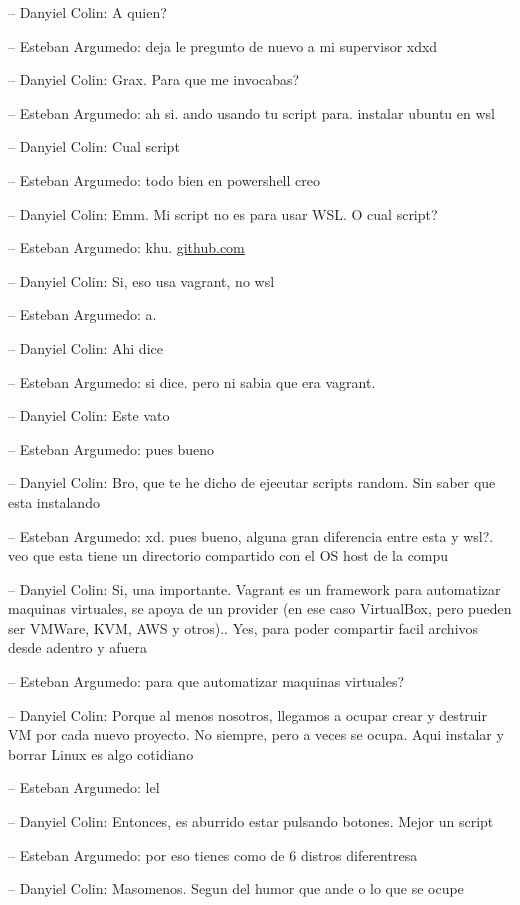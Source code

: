 -- Danyiel Colin: A quien?

-- Esteban Argumedo: deja le pregunto de nuevo a mi supervisor xdxd

-- Danyiel Colin: Grax. Para que me invocabas?

-- Esteban Argumedo: ah si. ando usando tu script para. instalar ubuntu
en wsl

-- Danyiel Colin: Cual script

-- Esteban Argumedo: todo bien en powershell creo

-- Danyiel Colin: Emm. Mi script no es para usar WSL. O cual script?

-- Esteban Argumedo: khu.
\href{https://github.com/DanEscher98/ClasesMaterial/tree/main/Setups/jdubuntu}{github.com}

-- Danyiel Colin: Si, eso usa vagrant, no wsl

-- Esteban Argumedo: a.

-- Danyiel Colin: Ahi dice

-- Esteban Argumedo: si dice. pero ni sabia que era vagrant.

-- Danyiel Colin: Este vato

-- Esteban Argumedo: pues bueno

-- Danyiel Colin: Bro, que te he dicho de ejecutar scripts random. Sin
saber que esta instalando

-- Esteban Argumedo: xd. pues bueno, alguna gran diferencia entre esta y
wsl?. veo que esta tiene un directorio compartido con el OS host de la
compu

-- Danyiel Colin: Si, una importante. Vagrant es un framework para
automatizar maquinas virtuales, se apoya de un provider (en ese caso
VirtualBox, pero pueden ser VMWare, KVM, AWS y otros).. Yes, para poder
compartir facil archivos desde adentro y afuera

-- Esteban Argumedo: para que automatizar maquinas virtuales?

-- Danyiel Colin: Porque al menos nosotros, llegamos a ocupar crear y
destruir VM por cada nuevo proyecto. No siempre, pero a veces se ocupa.
Aqui instalar y borrar Linux es algo cotidiano

-- Esteban Argumedo: lel

-- Danyiel Colin: Entonces, es aburrido estar pulsando botones. Mejor un
script

-- Esteban Argumedo: por eso tienes como de 6 distros diferentresa

-- Danyiel Colin: Masomenos. Segun del humor que ande o lo que se ocupe

